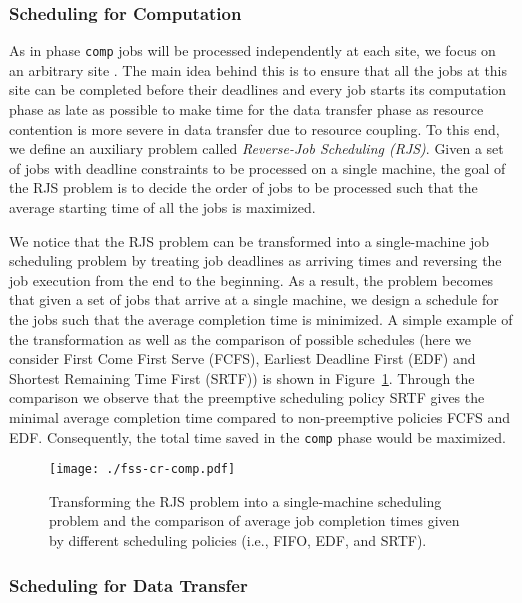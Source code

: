 \documentclass{article}
\begin{document}
\subsubsection{Scheduling for Computation}
As in phase \texttt{comp} jobs will be processed independently at each site, we focus on an arbitrary site . The main idea behind this is to ensure that all the jobs at this site can be completed before their deadlines and every job starts its computation phase as late as possible to make time for the data transfer phase as resource contention is more severe in data transfer due to resource coupling. To this end, we define an auxiliary problem called {\em Reverse-Job Scheduling (RJS)}. Given a set of jobs with deadline constraints to be processed on a single machine, the goal of the RJS problem is to decide the order of jobs to be processed such that the average starting time of all the jobs is maximized.

We notice that the RJS problem can be transformed into a single-machine job scheduling problem by treating job deadlines as arriving times and reversing the job execution from the end to the beginning. As a result, the problem becomes that given a set of jobs that arrive at a single machine, we design a schedule for the jobs such that the average completion time is minimized. A simple example of the transformation as well as the comparison of possible schedules (here we consider First Come First Serve (FCFS), Earliest Deadline First (EDF) and Shortest Remaining Time First (SRTF)) is shown in Figure~\ref{fig:fss-cr-comp}. Through the comparison we observe that the preemptive scheduling policy SRTF gives the minimal average completion time compared to non-preemptive policies FCFS and EDF. Consequently, the total time saved in the \texttt{comp} phase would be maximized.




\begin{figure}
\centering
\texttt{[image: ./fss-cr-comp.pdf]}
\caption{\label{fig:fss-cr-comp}Transforming the RJS problem into a single-machine scheduling problem and the comparison of average job completion times given by different scheduling policies (i.e., FIFO, EDF, and SRTF).}
\end{figure}



\subsubsection{Scheduling for Data Transfer}
\end{document}

